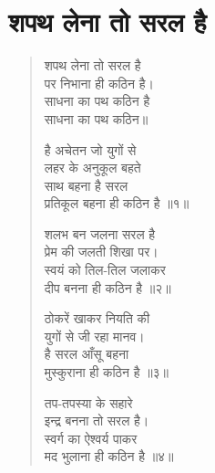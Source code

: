 \section{शपथ लेना तो सरल है}
\label{sec:shapath}

\begin{verse}

शपथ लेना तो सरल है\\
पर निभाना ही कठिन है।\\
साधना का पथ कठिन है\\
साधना का पथ कठिन॥

है अचेतन जो युगों से\\
लहर के अनुकूल बहते\\
साथ बहना है सरल\\
प्रतिकूल बहना ही कठिन है ॥१॥

शलभ बन जलना सरल है\\
प्रेम की जलती शिखा पर।\\
स्वयं को तिल-तिल जलाकर\\
दीप बनना ही कठिन है ॥२॥

ठोकरें खाकर नियति की\\
युगों से जी रहा मानव।\\
है सरल आँसू बहना\\
मुस्कुराना ही कठिन है ॥३॥

तप-तपस्या के सहारे\\
इन्द्र बनना तो सरल है।\\
स्वर्ग का ऐश्वर्य पाकर\\
मद भुलाना ही कठिन है ॥४॥

\end{verse}
